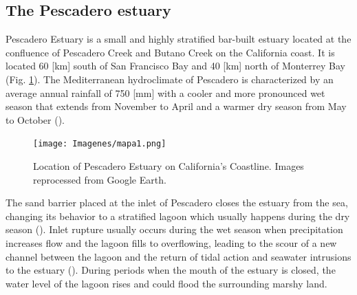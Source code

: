 \documentclass[11pt,letterpaper]{article}
\begin{document}



\subsection{The Pescadero estuary}

Pescadero Estuary is a small and highly stratified bar-built estuary located at the confluence of Pescadero Creek and Butano Creek on the California coast. It is located 60 [km] south of San Francisco Bay and 40 [km] north of Monterrey Bay (Fig. \ref{fig:locPDO}). The Mediterranean hydroclimate of Pescadero is characterized by an average annual rainfall of 750 [mm] with a cooler and more pronounced wet season that extends from November to April and a warmer dry season from May to October  (\cite{climatedata2021}).\\

\begin{figure}[h!]
    \centering
    \texttt{[image: Imagenes/mapa1.png]}
    \caption{Location of Pescadero Estuary on California’s Coastline. Images reprocessed from Google Earth.}
    \label{fig:locPDO}
\end{figure}

The sand barrier placed at the inlet of Pescadero closes the estuary from the sea, changing its behavior to a stratified lagoon which usually happens during the dry season (\cite{Williams2014}). Inlet rupture usually occurs during the wet season when precipitation increases flow and the lagoon fills to overflowing, leading to the scour of a new channel between the lagoon and the return of tidal action and seawater intrusions to the estuary (\cite{largier2015}). During periods when the mouth of the estuary is closed, the water level of the lagoon rises and could flood the surrounding marshy land. \\
\end{document}
